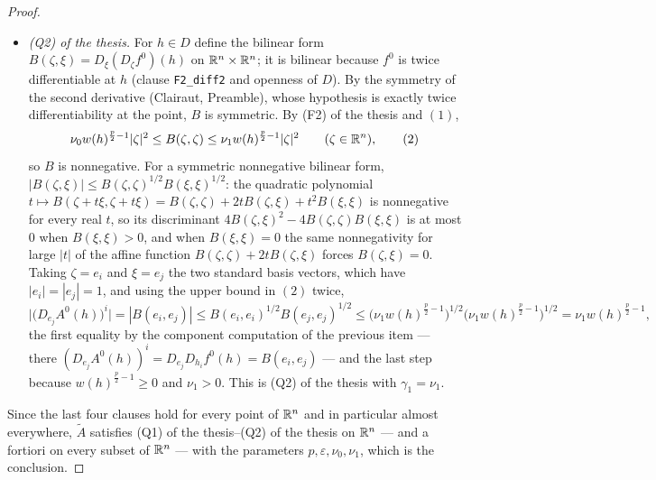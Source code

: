 \begin{proof}
\begin{itemize}
\[  =\sum_{i=1}^n\xi^iD_\xi D_{h_i}f^0(h)
  =D_\xi\Bigl(\sum_{i=1}^n\xi^iD_{h_i}f^0\Bigr)(h)
  =D_\xi\bigl(D_\xi f^0\bigr)(h),
  \tag{1}
  \]
  the middle equality because $\xi$ is a constant vector and differentiation in
  a fixed direction is linear.  The right-hand side is exactly the quantity
  that (F2) of the thesis estimates, and its lower bound there is
  $\nu_0w(h)^{\frac p2-1}|\xi|^2$, which is (Q1) of the thesis with
  $\gamma_0=\nu_0$.
\item \emph{(Q2) of the thesis.}  For $h\in D$ define the bilinear form
  $B(\zeta,\xi)=D_\xi(D_\zeta f^0)(h)$ on $\mathbb{R}^n\times\mathbb{R}^n$; it is bilinear
  because $f^0$ is twice differentiable at $h$ (clause \texttt{F2\_diff2} and
  openness of $D$).  By the symmetry of the second derivative (Clairaut,
  Preamble), whose hypothesis is exactly twice differentiability at the point,
  $B$ is symmetric.  By (F2) of the thesis and $(1)$,
  \[
  \nu_0w(h)^{\frac p2-1}|\zeta|^2\le B(\zeta,\zeta)\le
  \nu_1w(h)^{\frac p2-1}|\zeta|^2
  \qquad(\zeta\in\mathbb{R}^n),
  \tag{2}
  \]
  so $B$ is nonnegative.  For a symmetric nonnegative bilinear form,
  $|B(\zeta,\xi)|\le B(\zeta,\zeta)^{1/2}B(\xi,\xi)^{1/2}$: the quadratic
  polynomial $t\mapsto B(\zeta+t\xi,\zeta+t\xi)
  =B(\zeta,\zeta)+2tB(\zeta,\xi)+t^2B(\xi,\xi)$ is nonnegative for every real
  $t$, so its discriminant $4B(\zeta,\xi)^2-4B(\zeta,\zeta)B(\xi,\xi)$ is at
  most $0$ when $B(\xi,\xi)>0$, and when $B(\xi,\xi)=0$ the same nonnegativity
  for large $|t|$ of the affine function $B(\zeta,\zeta)+2tB(\zeta,\xi)$ forces
  $B(\zeta,\xi)=0$.  Taking $\zeta=e_i$ and $\xi=e_j$ the two standard basis
  vectors, which have $|e_i|=|e_j|=1$, and using the upper bound in $(2)$ twice,
  \[
  \bigl|\bigl(D_{e_j}A^0(h)\bigr)^i\bigr|=|B(e_i,e_j)|
  \le B(e_i,e_i)^{1/2}B(e_j,e_j)^{1/2}
  \le\bigl(\nu_1w(h)^{\frac p2-1}\bigr)^{1/2}\bigl(\nu_1w(h)^{\frac p2-1}\bigr)^{1/2}
  =\nu_1w(h)^{\frac p2-1},
  \]
  the first equality by the component computation of the previous item --- there
  $(D_{e_j}A^0(h))^i=D_{e_j}D_{h_i}f^0(h)=B(e_i,e_j)$ --- and the last step
  because $w(h)^{\frac p2-1}\ge0$ and $\nu_1>0$.  This is (Q2) of the thesis with
  $\gamma_1=\nu_1$.
\end{itemize}
Since the last four clauses hold for every point of $\mathbb{R}^n$ and in particular almost
everywhere, $\widetilde A$ satisfies (Q1) of the thesis--(Q2) of the thesis on $\mathbb{R}^n$ ---
and a fortiori on every subset of $\mathbb{R}^n$ --- with the parameters
$p,\varepsilon,\nu_0,\nu_1$, which is the conclusion.

\end{proof}
